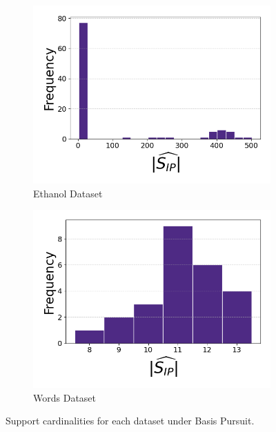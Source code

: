 \begin{figure}[t]
    \vspace{0.5em}  %

    \begin{subfigure}[b]{0.45\textwidth}
        \centering
        \includegraphics[width=\textwidth]{../figures/ethanol_cardinalities}
        \caption{Ethanol Dataset}
        \label{fig:ethanol_cardinalities}
    \end{subfigure}
    \hfill
    \begin{subfigure}[b]{0.45\textwidth}
        \centering
        \includegraphics[width=\textwidth]{../figures/words_cardinalities}
        \caption{Words Dataset}
        \label{fig:words_cardinalities}
    \end{subfigure}

    \caption{Support cardinalities for each dataset under Basis Pursuit.}
    \label{fig:support_cardinalities}
\end{figure}


